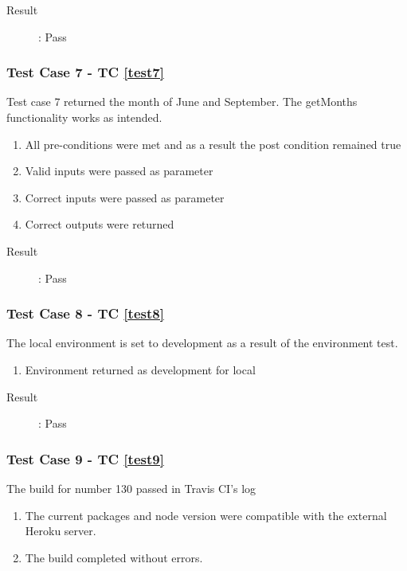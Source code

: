 \documentclass{article}
\begin{document}
\begin{description}
	\item [Result]: Pass 
\end{description}


\subsubsection{Test Case 7 - TC \ref{test7}}
Test case 7 returned the month of June and September. 
The getMonths functionality works as intended.
\begin{enumerate}
	\item All pre-conditions were met and as a result the post condition remained true
	\item Valid inputs were passed as parameter 
	\item Correct inputs were passed as parameter 
	\item Correct outputs were returned
\end{enumerate}

\begin{description}
	\item [Result]: Pass 
\end{description}


\subsubsection{Test Case 8 - TC \ref{test8}}
The local environment is set to development as a result of the environment test.
\begin{enumerate}
	\item Environment returned as development for local
\end{enumerate}

\begin{description}
	\item [Result]: Pass 
\end{description}


\subsubsection{Test Case 9 - TC \ref{test9}}
The build for number 130 passed in Travis CI's log
\begin{enumerate}
	\item The current packages and node version were compatible with the external Heroku server.
	\item The build completed without errors.
\end{enumerate}
\end{document}
